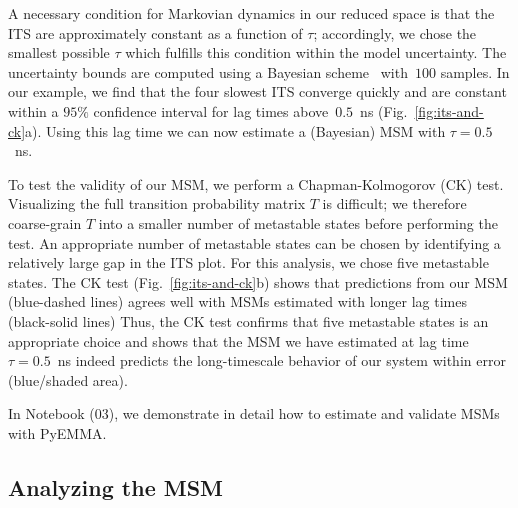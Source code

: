 \documentclass[9pt,tutorial]{livecoms}
\begin{document}
A necessary condition for Markovian dynamics in our reduced space is that the ITS are approximately constant as a function of $\tau$;
accordingly, we chose the smallest possible $\tau$ which fulfills this condition within the model uncertainty.
The uncertainty bounds are computed using a Bayesian scheme~\cite{ben-rev-msm,noe-tmat-sampling} with~$100$ samples.
In our example, we find that the four slowest ITS converge quickly and are constant within a $95\%$ confidence interval for lag times above~$0.5$~ns (Fig.~\ref{fig:its-and-ck}a).
Using this lag time we can now estimate a (Bayesian) MSM with $\tau=0.5$~ns. 

To test the validity of our MSM, we perform a Chapman-Kolmogorov (CK) test.
Visualizing the full transition probability matrix $T$ is difficult;
we therefore coarse-grain $T$ into a smaller number of metastable states before performing the test.
An appropriate number of metastable states can be chosen by identifying a relatively large gap in the ITS plot.
For this analysis, we chose five metastable states.
The CK test (Fig.~\ref{fig:its-and-ck}b) shows that predictions from our MSM (blue-dashed lines)
agrees well with MSMs estimated with longer lag times (black-solid lines)
Thus, the CK test confirms that five metastable states is an appropriate choice
and shows that the MSM we have estimated at lag time $\tau=0.5$~ns indeed predicts the
long-timescale behavior of our system within error (blue/shaded area).

In Notebook (03), we demonstrate in detail how to estimate and validate MSMs with PyEMMA.

\subsection{Analyzing the MSM}
\end{document}
